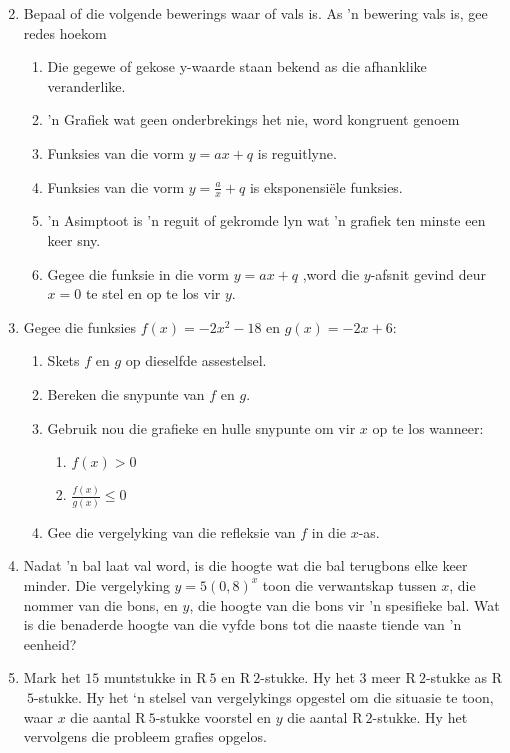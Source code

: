 \begin{eocexercises}{}
\begin{enumerate}[itemsep=9pt, label=\textbf{\arabic*}. ]
\begin{multicols}{3}
\begin{enumerate}[noitemsep, label=\textbf{(\alph*)} ]
    \end{enumerate}
\end{multicols}
  \item Bepaal of die volgende bewerings waar of vals is. As 'n bewering vals is, gee redes hoekom
    \begin{enumerate}[noitemsep, label=\textbf{(\alph*)} ]
    \item  Die gegewe of gekose y-waarde staan bekend as die afhanklike veranderlike.
    \item 'n Grafiek wat geen onderbrekings het nie, word kongruent genoem
    \item Funksies van die vorm $y=ax+q$ is reguitlyne.
    \item Funksies van die vorm $y=\frac{a}{x}+q$ is eksponensiële funksies.
    \item 'n Asimptoot is 'n reguit of gekromde lyn wat 'n grafiek ten minste een keer sny. 
    \item Gegee die funksie in die vorm $y=ax+q$ ,word die $y$-afsnit gevind deur $x=0$ te stel en op te los vir $y$.
    \end{enumerate}
\item Gegee die funksies $f(x)=-2{x}^{2}-18$ en $g(x)=-2x+6$:
    \begin{enumerate}[noitemsep, label=\textbf{(\alph*)} ]
    \item Skets $f$ en $g$ op dieselfde assestelsel.
    \item Bereken die snypunte van $f$ en $g$.
    \item Gebruik nou die grafieke en hulle snypunte om vir $x$ op te los wanneer:
	\begin{enumerate}[noitemsep, label=\textbf{\roman*}. ] 
	\item $f(x)>0$
	\item $\frac{f(x)}{g(x)}\leq 0$
	\end{enumerate}
    \item Gee die vergelyking van die refleksie van $f$ in die $x$-as.
    \end{enumerate}
\item Nadat ’n bal laat val word, is die hoogte wat die bal terugbons elke keer minder. Die vergelyking $y=5{(0,8)}^{x}$ toon die verwantskap tussen
 $x$, die nommer van die bons, en $y$, die hoogte van die bons vir ’n
spesifieke bal. Wat is die benaderde hoogte van die vyfde bons tot die naaste tiende van ’n eenheid?\newline
\item Mark het $15$ muntstukke in R$~5$ en R$~2$-stukke. Hy het $3$ meer R$~2$-stukke as R$~5$-stukke. Hy het ‘n stelsel van vergelykings opgestel om die situasie te toon, waar $x$  die aantal R$~5$-stukke voorstel en $y$ die aantal R$~2$-stukke. Hy het vervolgens die probleem grafies opgelos.

\end{enumerate}
\end{eocexercises}
